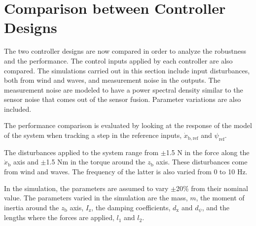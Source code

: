 \section{Comparison between Controller Designs}\label{sec:comparison}
The two controller designs are now compared in order to analyze the robustness and the performance. The control inputs applied by each controller are also compared. The simulations carried out in this section include input disturbances, both from wind and waves, and measurement noise in the outputs. The measurement noise are modeled to have a power spectral density similar to the sensor noise that comes out of the sensor fusion. Parameter variations are also included.

The performance comparison is evaluated by looking at the response of the model of the system when tracking a step in the reference inputs, $\dot{x}_\mathrm{b,ref}$ and $\psi_\mathrm{ref}$. 

The disturbances applied to the system range from $\pm$\num{1.5} N in the force along the $\dot{x}_\mathrm{b}$ axis and $\pm$\num{1.5} Nm in the torque around the $z_\mathrm{b}$ axis. These disturbances come from wind and waves. The frequency of the latter is also varied from 0 to 10 Hz.

In the simulation, the parameters are assumed to vary $\pm$20\% from their nominal value. The parameters varied in the simulation are the mass, $m$, the moment of inertia around the $z_\mathrm{b}$ axis, $I_\mathrm{z}$, the damping coefficients, $d_\mathrm{x}$ and $d_\psi$, and the lengths where the forces are applied, $l_1$ and $l_2$. 

